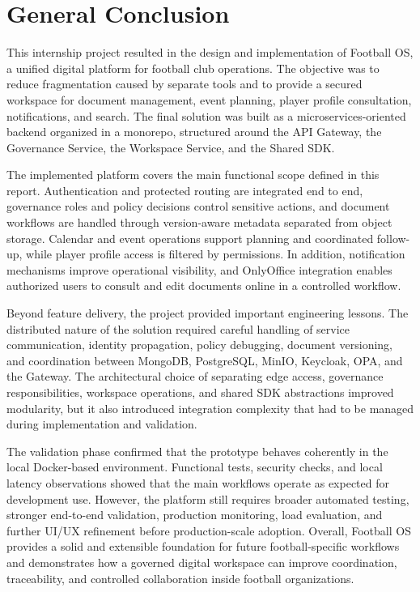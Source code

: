 \chapter*{General Conclusion}

This internship project resulted in the design and implementation of Football
OS, a unified digital platform for football club operations. The objective was
to reduce fragmentation caused by separate tools and to provide a secured
workspace for document management, event planning, player profile consultation,
notifications, and search. The final solution was built as a
microservices-oriented backend organized in a monorepo, structured around the
API Gateway, the Governance Service, the Workspace Service, and the Shared SDK.
\vspace{0.15cm}

The implemented platform covers the main functional scope defined in this
report. Authentication and protected routing are integrated end to end,
governance roles and policy decisions control sensitive actions, and document
workflows are handled through version-aware metadata separated from object
storage. Calendar and event operations support planning and coordinated
follow-up, while player profile access is filtered by permissions. In addition,
notification mechanisms improve operational visibility, and OnlyOffice
integration enables authorized users to consult and edit documents online in a
controlled workflow.
\vspace{0.15cm}

Beyond feature delivery, the project provided important engineering lessons.
The distributed nature of the solution required careful handling of service
communication, identity propagation, policy debugging, document versioning, and
coordination between MongoDB, PostgreSQL, MinIO, Keycloak, OPA, and the
Gateway. The architectural choice of separating edge access, governance
responsibilities, workspace operations, and shared SDK abstractions improved
modularity, but it also introduced integration complexity that had to be
managed during implementation and validation.
\vspace{0.15cm}

The validation phase confirmed that the prototype behaves coherently in the
local Docker-based environment. Functional tests, security checks, and local
latency observations showed that the main workflows operate as expected for
development use. However, the platform still requires broader automated
testing, stronger end-to-end validation, production monitoring, load
evaluation, and further UI/UX refinement before production-scale adoption.
Overall, Football OS provides a solid and extensible foundation for future
football-specific workflows and demonstrates how a governed digital workspace
can improve coordination, traceability, and controlled collaboration inside
football organizations.
